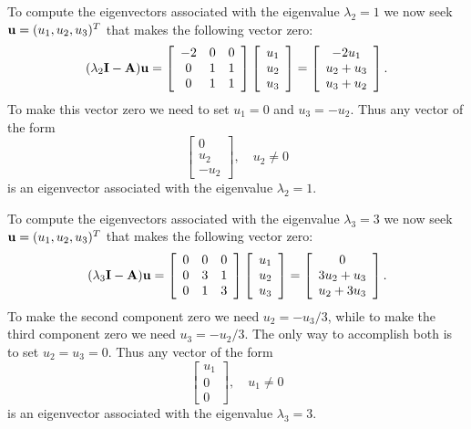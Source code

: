 \begin{solution}
\begin{enumerate}
To compute the eigenvectors associated with the eigenvalue $\lambda_2=1$ we now seek ${\bf u} = (u_1, u_2, u_3)^T$ that makes the following vector zero:
\[ (\lambda_2 {\bf I}-{\bf A}) {\bf u} = \left[\begin{array}{ccc}-2& 0 & 0 \\ 0 & 1 & 1 \\ 0 & 1 & 1\end{array}\right]
                             \left[\begin{array}{c}u_1 \\ u_2\\ u_3\end{array}\right]
                           = \left[\begin{array}{c}-2u_1 \\ u_2+u_3 \\ u_3+u_2\end{array}\right].\]
To make this vector zero we need to set $u_1 = 0$ and $u_3 = -u_2$.
Thus any vector of the form
\[ \left[\begin{array}{c}0 \\ u_2 \\ -u_2\end{array}\right], \quad u_2 \ne 0\]
is an eigenvector associated with the eigenvalue $\lambda_2=1$.

To compute the eigenvectors associated with the eigenvalue $\lambda_3=3$ we now seek ${\bf u} = (u_1, u_2, u_3)^T$ that makes the following vector zero:
\[ (\lambda_3 {\bf I}-{\bf A}) {\bf u} = \left[\begin{array}{ccc}0& 0 & 0 \\ 0 & 3 & 1 \\ 0 & 1 & 3\end{array}\right]
                             \left[\begin{array}{c}u_1 \\ u_2\\ u_3\end{array}\right]
                           = \left[\begin{array}{c}0 \\ 3u_2+u_3 \\ u_2+3u_3\end{array}\right].\]
To make the second component zero we need $u_2 = -u_3/3$, while to make
the third component zero we need $u_3 = -u_2/3$.  The only way to accomplish
both is to set $u_2=u_3=0$.  Thus any vector of the form
\[ \left[\begin{array}{c}u_1 \\ 0 \\ 0\end{array}\right], \quad u_1 \ne 0\]
is an eigenvector associated with the eigenvalue $\lambda_3=3$.


\end{enumerate}
\end{solution}
